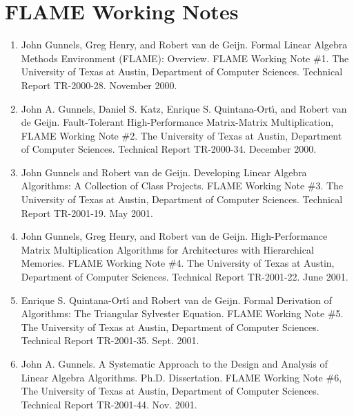 \section{FLAME Working Notes}

\renewcommand\labelenumi{W\theenumi}

\begin{enumerate}
\item
      John Gunnels, Greg Henry, and Robert van de Geijn. Formal
      Linear Algebra Methods Environment (FLAME): Overview. FLAME
      Working Note \#1. The University of Texas at Austin, Department
      of Computer Sciences. Technical Report TR-2000-28. November
      2000.

\item
      John A. Gunnels, Daniel S. Katz, Enrique S. Quintana-Ort\'{\i}, and
      Robert van de Geijn. Fault-Tolerant High-Performance
      Matrix-Matrix Multiplication, FLAME Working Note \#2. The
      University of Texas at Austin, Department of Computer
      Sciences. Technical Report TR-2000-34. December 2000.

\item
      John Gunnels and Robert van de Geijn. Developing Linear Algebra
      Algorithms: A Collection of Class Projects. FLAME Working Note
      \#3. The University of Texas at Austin, Department of Computer
      Sciences. Technical Report TR-2001-19. May 2001.

\item
      John Gunnels, Greg Henry, and Robert van de
      Geijn. High-Performance Matrix Multiplication Algorithms for
      Architectures with Hierarchical Memories. FLAME Working Note
      \#4. The University of Texas at Austin, Department of Computer
      Sciences. Technical Report TR-2001-22. June 2001.

\item
      Enrique S. Quintana-Ort\'{\i} and Robert van de Geijn. Formal
      Derivation of Algorithms: The Triangular Sylvester Equation.
      FLAME Working Note \#5. The University of Texas at Austin,
      Department of Computer Sciences. Technical Report
      TR-2001-35. Sept. 2001. 

\item
      John A. Gunnels. A Systematic Approach to the Design and
      Analysis of Linear Algebra Algorithms.
      Ph.D. Dissertation. FLAME Working Note \#6, The University of
      Texas at Austin, Department of Computer Sciences. Technical
      Report TR-2001-44. Nov. 2001.


\end{enumerate}
